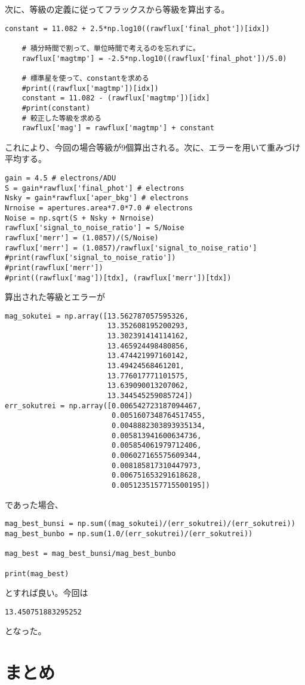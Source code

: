 次に、等級の定義に従ってフラックスから等級を算出する。
\begin{screen}
\small{
\begin{verbatim}
constant = 11.082 + 2.5*np.log10((rawflux['final_phot'])[idx])

    # 積分時間で割って、単位時間で考えるのを忘れずに。
    rawflux['magtmp'] = -2.5*np.log10((rawflux['final_phot'])/5.0)

    # 標準星を使って、constantを求める
    #print((rawflux['magtmp'])[idx])
    constant = 11.082 - (rawflux['magtmp'])[idx]
    #print(constant)
    # 較正した等級を求める
    rawflux['mag'] = rawflux['magtmp'] + constant\end{verbatim}
}
\end{screen}
これにより、今回の場合等級が9個算出される。次に、エラーを用いて重みづけ平均する。
\begin{screen}
\small{
\begin{verbatim}
gain = 4.5 # electrons/ADU
S = gain*rawflux['final_phot'] # electrons
Nsky = gain*rawflux['aper_bkg'] # electrons
Nrnoise = apertures.area*7.0*7.0 # electrons
Noise = np.sqrt(S + Nsky + Nrnoise)
rawflux['signal_to_noise_ratio'] = S/Noise
rawflux['merr'] = (1.0857)/(S/Noise)
rawflux['merr'] = (1.0857)/rawflux['signal_to_noise_ratio']
#print(rawflux['signal_to_noise_ratio'])
#print(rawflux['merr'])
#print((rawflux['mag'])[tdx], (rawflux['merr'])[tdx])\end{verbatim}
}
\end{screen}
算出された等級とエラーが
\begin{screen}
\small{
\begin{verbatim}
mag_sokutei = np.array([13.562787057595326,
                        13.352608195200293,
                        13.302391414114162,
                        13.465924498480856,
                        13.474421997160142,
                        13.49424568461201,
                        13.776017771101575,
                        13.639090013207062,
                        13.344545259085724])
err_sokutrei = np.array([0.006542723187094467,
                         0.0051607348764517455,
                         0.0048882303893935134,
                         0.005813941600634736,
                         0.005854061979712406,
                         0.006027165575609344,
                         0.008185817310447973,
                         0.006751653291618628,
                         0.0051235157715500195])\end{verbatim}
}
\end{screen}
であった場合、
\begin{screen}
\begin{verbatim}
mag_best_bunsi = np.sum((mag_sokutei)/(err_sokutrei)/(err_sokutrei))
mag_best_bunbo = np.sum(1.0/(err_sokutrei)/(err_sokutrei))

mag_best = mag_best_bunsi/mag_best_bunbo

print(mag_best)
\end{verbatim}
\end{screen}
とすれば良い。今回は
\begin{verbatim}
13.450751883295252\end{verbatim}
となった。

    \section*{まとめ}
